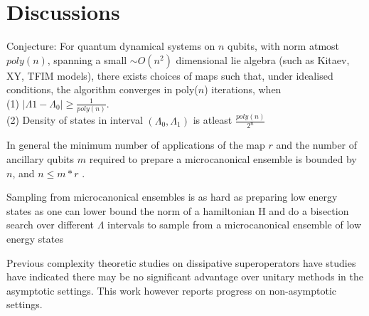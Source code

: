 \documentclass[10pt]{amsart}
\begin{document}


\section{Discussions}
Conjecture: For quantum dynamical systems on $n$ qubits, with norm atmost $poly(n)$, spanning a small $\sim O(n^2)$ dimensional lie algebra (such as Kitaev, XY, TFIM models), there exists choices of maps such that, under idealised conditions, the algorithm converges in poly($n$) iterations, when \\
(1) $|\Lambda1 - \Lambda_0| \geq \frac{1}{poly(n)}$.\\
(2) Density of states in interval $(\Lambda_0,\Lambda_1)$ is atleast $\frac{poly(n)}{2^n}$ 

In general the minimum number of applications of the map $r$ and the number of ancillary qubits $m$ required to prepare a microcanonical ensemble is bounded by $n$, and $n \leq m*r$ \cite{Z24}.

Sampling from microcanonical ensembles is as hard as preparing low energy states as one can lower bound the norm of a hamiltonian H and do a bisection search over different $\Lambda$ intervals to sample from a microcanonical ensemble of low energy states

Previous complexity theoretic studies on dissipative superoperators have studies have indicated there may be no significant advantage over unitary methods in the asymptotic settings. This work however reports progress on non-asymptotic settings.
\end{document}
